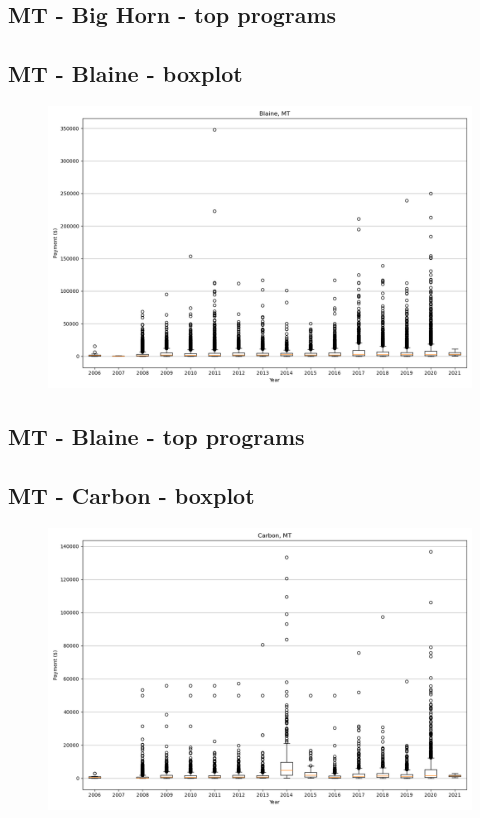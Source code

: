 \subsection*{MT - Big Horn - top programs}

\newpage
\subsection*{MT - Blaine - boxplot}
\begin{figure}[h]
\centering
\includegraphics[width=7in]{../output/boxplots/counties/Blaine-MT_boxplot.png}
\end{figure}


\subsection*{MT - Blaine - top programs}

\newpage
\subsection*{MT - Carbon - boxplot}
\begin{figure}[h]
\centering
\includegraphics[width=7in]{../output/boxplots/counties/Carbon-MT_boxplot.png}
\end{figure}


